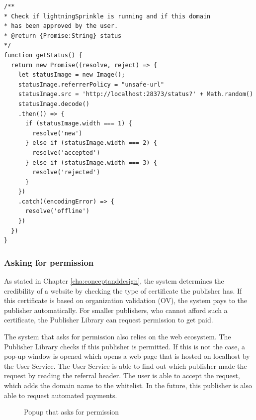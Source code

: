 \lstset{language=JavaScript}
\lstset{frame=lines}
\lstset{basicstyle=\footnotesize}
\begin{lstlisting}
/**
* Check if lightningSprinkle is running and if this domain 
* has been approved by the user.
* @return {Promise:String} status
*/
function getStatus() {
  return new Promise((resolve, reject) => {
    let statusImage = new Image();
    statusImage.referrerPolicy = "unsafe-url"
    statusImage.src = 'http://localhost:28373/status?' + Math.random()
    statusImage.decode()
    .then(() => {
      if (statusImage.width === 1) {
        resolve('new')
      } else if (statusImage.width === 2) {
        resolve('accepted')
      } else if (statusImage.width === 3) {
        resolve('rejected')
      }
    })
    .catch((encodingError) => {
      resolve('offline')
    })
  })
}
\end{lstlisting}

\subsubsection{Asking for permission}
As stated in Chapter \ref{cha:conceptanddesign}, the system determines the credibility of a website by checking the type of certificate the publisher has. If this certificate is based on organization validation (OV), the system pays to the publisher automatically. For smaller publishers, who cannot afford such a certificate, the Publisher Library can request permission to get paid. 

The system that asks for permission also relies on the web ecosystem. The Publisher Library checks if this publisher is permitted. If this is not the case, a pop-up window is opened which opens a web page that is hosted on localhost by the User Service. The User Service is able to find out which publisher made the request by reading the referral header. The user is able to accept the request, which adds the domain name to the whitelist. In the future, this publisher is also able to request automated payments.

\begin{figure}[h!]
  \setlength{\fboxsep}{0pt}%
  \caption{Popup that asks for permission}
\end{figure}

